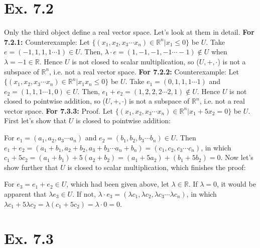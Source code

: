 \documentclass[11pt,twoside,a4paper]{article}
\begin{document}
\section{Ex. 7.2}
Only the third object define a real vector space. Let's look at them in detail.\newline
\textbf{For 7.2.1:}\newline
Counterexample: Let $\{(x_1 ,x_2 ,x_3\cdots x_n)\in\mathbb{R}^{n}|x_1 \leq 0\}$ be $U$. Take $e=(-1,1,1,1\cdots 1)\in U$. Then, $\lambda\cdot e=(1,-1,-1,-1\cdots -1)\not\in U$ when $\lambda=-1\in\mathbb{R}$. Hence $U$ is not closed to scalar multiplication, so ($U,+,\cdot$) is not a subspace of $\mathbb{R}^n$, i.e. not a real vector space.\newline
\textbf{For 7.2.2:}\newline
Counterexample: Let $\{(x_1 ,x_2 ,x_3\cdots x_n)\in\mathbb{R}^{n}|x_{1}x_{n}\leq 0\}$ be $U$. Take $e_1 =(0,1,1,1\cdots 1)$ and $e_2 =(1,1,1\cdots 1,0)\in U$. Then, $e_1 +e_2 =(1,2,2,2\cdots 2,1)\not\in U$. Hence $U$ is not closed to pointwise addition, so ($U,+,\cdot$) is not a subspace of $\mathbb{R}^n$, i.e. not a real vector space.\newline
\textbf{For 7.3.3:}\newline
Proof. Let $\{(x_1 ,x_2 ,x_3\cdots x_n)\in\mathbb{R}^{n}|x_{1}+5x_{2}=0\}$ be $U$. First let's show that $U$ is closed to pointwise addition:
\par
For $e_1 =(a_1 ,a_2 ,a_3\cdots a_n )$ and $e_2 =(b_1 ,b_2, b_3\cdots b_n)\in U$. Then $e_1 +e_2 =(a_1 +b_1 ,a_2 +b_2 ,a_3 +b_3\cdots a_n +b_n )=(c_1 ,c_2, c_3\cdots c_n )$, in which $c_1 +5c_2 =(a_1 +b_1 )+5(a_2 +b_2 )=(a_1 +5a_2 )+(b_1 +5b_2 )=0$.
\newline
\newline
Now let's show further that $U$ is closed to scalar multiplication, which finishes the proof:
\par
For $e_3 =e_1 +e_2\in U$, which had been given above, let $\lambda\in\mathbb{R}$. If $\lambda =0$, it would be apparent that $\lambda e_3\in U$. If not, $\lambda\cdot e_3 =(\lambda c_1 ,\lambda c_2, \lambda c_3\cdots\lambda c_n )$, in which $\lambda c_1 +5\lambda c_2 =\lambda(c_1 +5c_2 )=\lambda\cdot 0=0$.\par\noindent{}
\section{Ex. 7.3}
\end{document}
